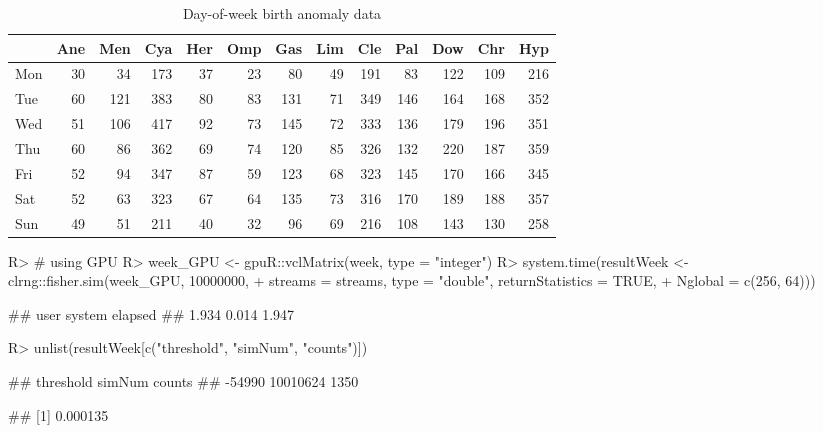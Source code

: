 \documentclass[article,nojss]{jss}\usepackage[]{graphicx}\usepackage[]{color}
\begin{document}
\begin{table}

\caption{\label{tab:weekdata}Day-of-week birth anomaly data\label{tab:week}}
\centering
\begin{tabular}[t]{lrrrrrrrrrrrr}
\toprule
  & Ane & Men & Cya & Her & Omp & Gas & Lim & Cle & Pal & Dow & Chr & Hyp\\
\midrule
Mon & 30 & 34 & 173 & 37 & 23 & 80 & 49 & 191 & 83 & 122 & 109 & 216\\
Tue & 60 & 121 & 383 & 80 & 83 & 131 & 71 & 349 & 146 & 164 & 168 & 352\\
Wed & 51 & 106 & 417 & 92 & 73 & 145 & 72 & 333 & 136 & 179 & 196 & 351\\
Thu & 60 & 86 & 362 & 69 & 74 & 120 & 85 & 326 & 132 & 220 & 187 & 359\\
Fri & 52 & 94 & 347 & 87 & 59 & 123 & 68 & 323 & 145 & 170 & 166 & 345\\
Sat & 52 & 63 & 323 & 67 & 64 & 135 & 73 & 316 & 170 & 189 & 188 & 357\\
Sun & 49 & 51 & 211 & 40 & 32 & 96 & 69 & 216 & 108 & 143 & 130 & 258\\
\bottomrule
\end{tabular}
\end{table}


\begin{CodeChunk}
\begin{CodeInput}
R> # using GPU
R> week_GPU <- gpuR::vclMatrix(week, type = "integer")
R> system.time(resultWeek <- clrng::fisher.sim(week_GPU, 10000000,
+    streams = streams, type = "double", returnStatistics = TRUE,
+    Nglobal = c(256, 64)))
\end{CodeInput}
\begin{CodeOutput}
##    user  system elapsed 
##   1.934   0.014   1.947
\end{CodeOutput}
\begin{CodeInput}
R> unlist(resultWeek[c("threshold", "simNum", "counts")])
\end{CodeInput}
\begin{CodeOutput}
## threshold    simNum    counts 
##    -54990  10010624      1350
\end{CodeOutput}
\begin{CodeOutput}
## [1] 0.000135
\end{CodeOutput} 
\end{CodeChunk} 
\end{document}
